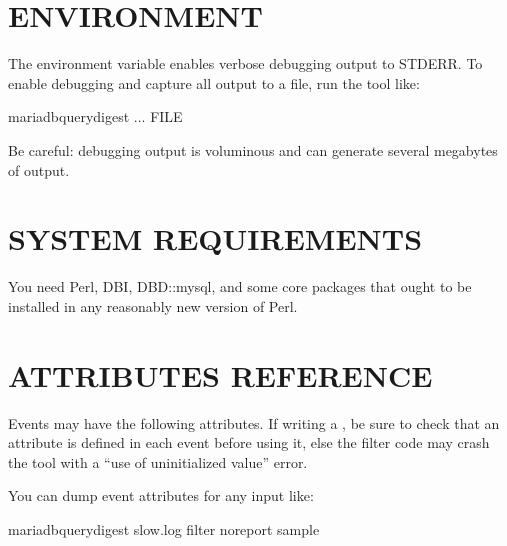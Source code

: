 \documentclass[letterpaper,10pt,english]{sphinxmanual}
\begin{document}
\section{ENVIRONMENT}
\label{\detokenize{mariadb-query-digest:environment}}
\sphinxAtStartPar
The environment variable  enables verbose debugging output to STDERR.
To enable debugging and capture all output to a file, run the tool like:

\begin{sphinxVerbatim}[commandchars=\\\{\}]
 mariadb\PYGZhy{}query\PYGZhy{}digest ... \PYGZgt{} FILE \PYGZgt{}
\end{sphinxVerbatim}

\sphinxAtStartPar
Be careful: debugging output is voluminous and can generate several megabytes
of output.


\section{SYSTEM REQUIREMENTS}
\label{\detokenize{mariadb-query-digest:system-requirements}}
\sphinxAtStartPar
You need Perl, DBI, DBD::mysql, and some core packages that ought to be
installed in any reasonably new version of Perl.


\section{ATTRIBUTES REFERENCE}
\label{\detokenize{mariadb-query-digest:attributes-reference}}
\sphinxAtStartPar
Events may have the following attributes.  If writing a {\hyperref[\detokenize{mariadb-query-digest:cmdoption-mariadb-query-digest-filter}]{}},
be sure to check that an attribute is defined in each event before
using it, else the filter code may crash the tool with a
“use of uninitialized value” error.

\sphinxAtStartPar
You can dump event attributes for any input like:

\begin{sphinxVerbatim}[commandchars=\\\{\}]
\PYGZdl{} mariadb\PYGZhy{}query\PYGZhy{}digest                  
    slow.log                       
    \PYGZhy{}\PYGZhy{}filter  
    \PYGZhy{}\PYGZhy{}no\PYGZhy{}report                    
    \PYGZhy{}\PYGZhy{}sample 
\end{sphinxVerbatim}
\end{document}
